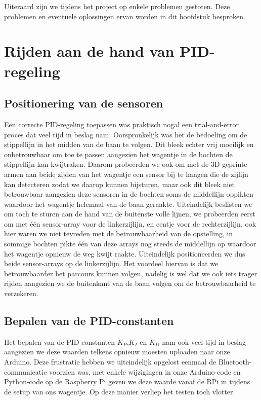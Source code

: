Uiteraard zijn we tijdens het project op enkele problemen gestoten. Deze problemen en eventuele oplossingen ervan worden in dit hoofdstuk besproken.

\section{Rijden aan de hand van PID-regeling}
\subsection{Positionering van de sensoren}
Een correcte PID-regeling toepassen was praktisch nogal een trial-and-error proces dat veel tijd in beslag nam. Oorspronkelijk was het de bedoeling om de stippellijn in het midden van de baan te volgen. Dit bleek echter vrij moeilijk en onbetrouwbaar om toe te passen aangezien het wagentje in de bochten de stippellijn kan kwijtraken. Daarom probeerden we ook om met de 3D-geprinte armen aan beide zijden van het wagentje een sensor bij te hangen die de zijlijn kan detecteren zodat we daarop kunnen bijsturen, maar ook dit bleek niet betrouwbaar aangezien deze sensoren in de bochten soms de middellijn oppikten waardoor het wagentje helemaal van de baan geraakte. Uiteindelijk beslisten we om toch te sturen aan de hand van de buitenste volle lijnen, we probeerden eerst om met \'e\'en sensor-array voor de linkerzijlijn, en eentje voor de rechterzijlijn, ook hier waren we niet tevreden met de betrouwbaarheid van de opstelling, in sommige bochten pikte \'e\'en van deze arrays nog steeds de middellijn op waardoor het wagentje opnieuw de weg kwijt raakte. Uiteindelijk positioneerden we dus beide sensor-arrays op de linkerzijlijn. Het voordeel hiervan is dat we betrouwbaarder het parcours kunnen volgen, nadelig is wel dat we ook iets trager rijden aangezien we de buitenkant van de baan volgen om de betrouwbaarheid te verzekeren.
\subsection{Bepalen van de PID-constanten}
Het bepalen van de PID-constanten $K_P$,$K_I$ en $K_D$ nam ook veel tijd in beslag aangezien we deze waarden telkens opnieuw moesten uploaden naar onze Arduino. Deze frustratie hebben we uiteindelijk opgelost eenmaal de Bluetooth-communicatie voorzien was, met enkele wijzigingen in onze Arduino-code en Python-code op de Raspberry Pi geven we deze waarde vanaf de RPi in tijdens de setup van ons wagentje. Op deze manier verliep het testen toch vlotter.

